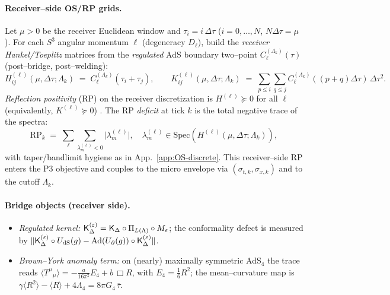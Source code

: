 \documentclass[10pt]{article}
\theoremstyle{definition}
\theoremstyle{plain}
\begin{document}
\paragraph{Receiver–side OS/RP grids.}\label{par:uom-main-013}
Let $\mu>0$ be the receiver Euclidean window and $\tau_i=i\,\Delta\tau$ ($i=0,\dots,N$, $N\Delta\tau=\mu$). For each $S^3$ angular momentum $\ell$ (degeneracy $D_\ell$), build the \emph{receiver Hankel/Toeplitz} matrices from the \emph{regulated} AdS boundary two–point $C^{(\Lambda_k)}_\ell(\tau)$ (post–bridge, post–welding):
\[
H^{(\ell)}_{ij}(\mu,\Delta\tau;\Lambda_k)\;=\;C^{(\Lambda_k)}_\ell(\tau_i+\tau_j),\qquad
K^{(\ell)}_{ij}(\mu,\Delta\tau;\Lambda_k)\;=\;\sum_{p\le i}\sum_{q\le j} C^{(\Lambda_k)}_\ell((p{+}q)\Delta\tau)\,\Delta\tau^2.
\]
\emph{Reflection positivity} (RP) on the receiver discretization is $H^{(\ell)}\succeq 0$ for all $\ell$ (equivalently, $K^{(\ell)}\succeq 0$) \cite{OsterwalderSchrader1973,OsterwalderSchrader1975}. The RP \emph{deficit} at tick $k$ is the total negative trace of the spectra:
\[
\mathrm{RP}_{k}\;=\;\sum_{\ell}\sum_{\lambda_m^{(\ell)}<0}\bigl|\lambda_m^{(\ell)}\bigr|,\quad
\lambda_m^{(\ell)}\in\mathrm{Spec}\!\left(H^{(\ell)}(\mu,\Delta\tau;\Lambda_k)\right),
\]
with taper/bandlimit hygiene as in App.~\ref{app:OS-discrete}. This receiver–side RP enters the P3 objective and couples to the micro envelope via $(\sigma_{t,k},\sigma_{x,k})$ and to the cutoff $\Lambda_k$.

\paragraph{Bridge objects (receiver side).}\label{par:uom-main-014}
\begin{itemize}[leftmargin=1.5em, itemsep=2pt]
\item \emph{Regulated kernel:} ${\sf K}_\Delta^{(\varepsilon)}={\sf K}_\Delta\circ \Pi_{L(\Lambda)}\circ M_\varepsilon$; the conformality defect is measured by
$\|{\sf K}_\Delta^{(\varepsilon)} \circ U_{\rm dS}(g) - \mathrm{Ad}(U_\partial(g))\circ {\sf K}_\Delta^{(\varepsilon)}\|$.
\item \emph{Brown–York anomaly term:} on (nearly) maximally symmetric AdS$_4$ the trace reads
$\langle T^\mu{}_\mu\rangle = -\tfrac{a}{16\pi^2}E_4 + b\,\Box R$, with $E_4=\tfrac16 R^2$; the mean–curvature map is
$\gamma\langle R^2\rangle-\langle R\rangle+4\Lambda_4=8\pi G_4\,\overline{\tau}$.
\end{itemize}

\newpage
\end{document}

